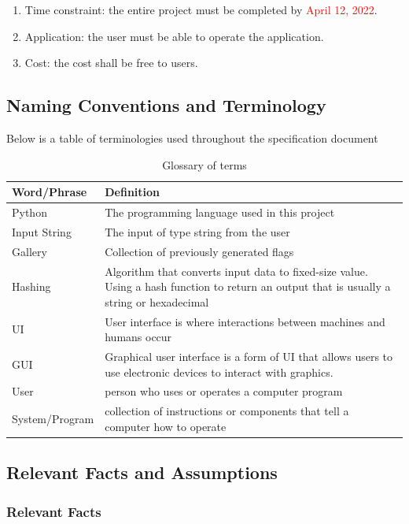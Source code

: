 \documentclass[12pt, titlepage]{article}
\begin{document}
\begin{enumerate}
    \item Time constraint: the entire project must be completed by \textcolor{red}{April 12, 2022}.
    \item Application: the user must be able to operate the application.
    \item Cost: the cost shall be free to users.
  \end{enumerate}

\subsection{Naming Conventions and Terminology}

Below is a table of terminologies used throughout the specification document
\begin{table}[!h]
\caption{Glossary of terms}
\label{t}
\begin{tabular}{|l|p{13cm}|}
\hline
Word/Phrase & Definition\\
\hline
Python & The programming language used in this project\\
\hline
Input String & The input of type string from the user\\
\hline
Gallery & Collection of previously generated flags\\
\hline
Hashing & Algorithm that converts input data to fixed-size value. Using a hash function to return an output that is usually a string or hexadecimal\\
\hline
UI & User interface is where interactions between machines and humans occur\\
\hline
GUI & Graphical user interface is a form of UI that allows users to use electronic devices to interact with graphics.\\
\hline
User & person who uses or operates a computer program\\
\hline
System/Program & collection of instructions or components that tell a computer how to operate\\
\hline
\end{tabular}
\end{table}

\subsection{Relevant Facts and Assumptions}
\subsubsection{Relevant Facts}
\end{document}
